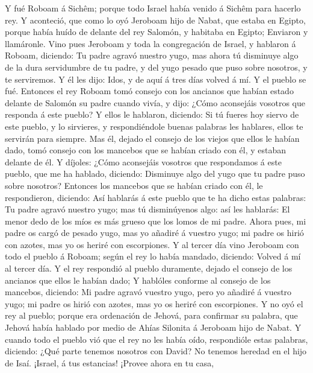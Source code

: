  Y fué Roboam á Sichêm; porque todo Israel había venido á
Sichêm para hacerlo rey.  Y aconteció, que como lo oyó
Jeroboam hijo de Nabat, que estaba en Egipto, porque había huído de
delante del rey Salomón, y habitaba en Egipto;  Enviaron y
llamáronle. Vino pues Jeroboam y toda la congregación de Israel, y
hablaron á Roboam, diciendo:  Tu padre agravó nuestro yugo,
mas ahora tú disminuye algo de la dura servidumbre de tu padre, y del
yugo pesado que puso sobre nosotros, y te serviremos.  Y él
les dijo: Idos, y de aquí á tres días volved á mí. Y el pueblo se fué.
 Entonces el rey Roboam tomó consejo con los ancianos que
habían estado delante de Salomón su padre cuando vivía, y dijo: ¿Cómo
aconsejáis vosotros que responda á este pueblo?  Y ellos le
hablaron, diciendo: Si tú fueres hoy siervo de este pueblo, y lo
sirvieres, y respondiéndole buenas palabras les hablares, ellos te
servirán para siempre.  Mas él, dejado el consejo de los
viejos que ellos le habían dado, tomó consejo con los mancebos que se
habían criado con él, y estaban delante de él.  Y díjoles:
¿Cómo aconsejáis vosotros que respondamos á este pueblo, que me ha
hablado, diciendo: Disminuye algo del yugo que tu padre puso sobre
nosotros?  Entonces los mancebos que se habían criado con
él, le respondieron, diciendo: Así hablarás á este pueblo que te ha
dicho estas palabras: Tu padre agravó nuestro yugo; mas tú disminúyenos
algo: así les hablarás: El menor dedo de los míos es más grueso que los
lomos de mi padre.  Ahora pues, mi padre os cargó de pesado
yugo, mas yo añadiré á vuestro yugo; mi padre os hirió con azotes, mas
yo os heriré con escorpiones.  Y al tercer día vino
Jeroboam con todo el pueblo á Roboam; según el rey lo había mandado,
diciendo: Volved á mí al tercer día.  Y el rey respondió al
pueblo duramente, dejado el consejo de los ancianos que ellos le habían
dado;  Y hablóles conforme al consejo de los mancebos,
diciendo: Mi padre agravó vuestro yugo, pero yo añadiré á vuestro yugo;
mi padre os hirió con azotes, mas yo os heriré con escorpiones.
 Y no oyó el rey al pueblo; porque era ordenación de
Jehová, para confirmar su palabra, que Jehová había hablado por medio de
Ahías Silonita á Jeroboam hijo de Nabat.  Y cuando todo el
pueblo vió que el rey no les había oído, respondióle estas palabras,
diciendo: ¿Qué parte tenemos nosotros con David? No tenemos heredad en
el hijo de Isaí. ¡Israel, á tus estancias! ¡Provee ahora en tu casa,
